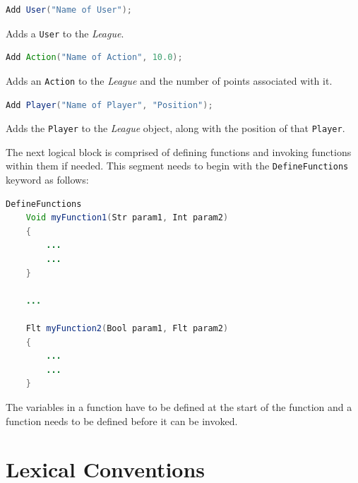 \documentclass[12pt]{report}
\begin{document}
\begin{singlespace}
\begin{lstlisting}[language=Java,label=some-code,caption=Adding a User]
Add User("Name of User");
\end{lstlisting}
\end{singlespace}

Adds a \texttt{User} to the \textit{League}.

\begin{singlespace}
\begin{lstlisting}[language=Java,label=some-code,caption=Adding an Action]
Add Action("Name of Action", 10.0);
\end{lstlisting}
\end{singlespace}

Adds an \texttt{Action} to the \textit{League} and the number of points associated with it.

\begin{singlespace}
\begin{lstlisting}[language=Java,label=some-code,caption=Adding a Player]
Add Player("Name of Player", "Position");	
\end{lstlisting}
\end{singlespace}

Adds the \texttt{Player} to the \textit{League} object, along with the position of that \texttt{Player}.

The next logical block is comprised of defining functions and invoking functions within them if needed. This segment needs to begin with the \texttt{DefineFunctions} keyword as follows:

\begin{singlespace}
\begin{lstlisting}[language=Java,label=some-code,caption=Defining functions]
DefineFunctions
	Void myFunction1(Str param1, Int param2)
	{
		...
		...
	}

	...

	Flt myFunction2(Bool param1, Flt param2)
	{
		...
		...
	}
\end{lstlisting}
\end{singlespace}

The variables in a function have to be defined at the start of the function and a function needs to be defined before it can be invoked. 

\section{Lexical Conventions}
\end{document}
